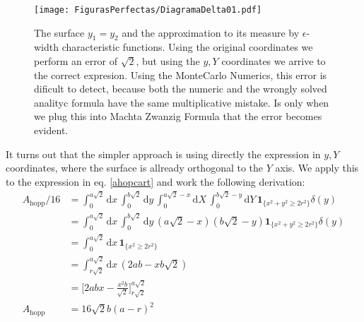 \documentclass[superscriptaddress,pre,reprint,showpacs,onecolumn]{revtex4-1}
\newcommand{\rd}[1]{\mathrm{d}{#1} \,}
\newcommand{\indicator}[1]{\mathbf{1}_{ \{   #1 \} } }
\begin{document}
\begin{figure}
\texttt{[image: FigurasPerfectas/DiagramaDelta01.pdf]}
\caption{The surface $y_1=y_2$ and the approximation to its measure by
  $\epsilon$-width characteristic functions. Using the original coordinates
  we perform an error of $\sqrt{2}$, but using the $y,Y$ coordinates
  we arrive to the correct expresion. Using the MonteCarlo Numerics, this
  error is dificult to detect, because both the numeric and the wrongly solved
  analityc formula have the same multiplicative mistake. Is only when we plug this into
Machta Zwanzig Formula that the error becomes evident. }\label{DiagramaDelta01}
\end{figure}

It turns out that the simpler approach is using directly the expression in $y,Y$
coordinates, where the surface is allready orthogonal to the $Y$ axis. 
We apply this to the expression in eq. \ref{ahopcart} and work the following
  derivation:
  \begin{align}
    A_\text{hopp}/16 & = \int_0^{a\sqrt{2}} \rd x  \int_0^{b \sqrt{2}} \rd y
    \int_0^{a\sqrt{2}-x} \rd X  \int_0^{b \sqrt{2}-y} \rd Y
    \indicator{x^2+y^2 \geq 2 r^2} \delta (y)\\
    &=  \int_0^{a\sqrt{2}} \rd x  \int_0^{b \sqrt{2}} \rd y
    (a\sqrt{2}-x)(b\sqrt{2}-y)
    \indicator{x^2+y^2 \geq 2 r^2} \delta (y)\\
    &= \int_0^{a\sqrt{2}} \rd x
    \indicator{x^2\geq 2 r^2} \\
    &= \int_{r\sqrt{2}}^{a\sqrt{2}} \rd x
    (2ab-xb\sqrt{2})\\
    &=\biggl[2abx-\frac{x^2b}{\sqrt{2}} \biggr]_{r\sqrt{2}}^{a\sqrt{2}}\\
      A_\text{hopp}&=16\sqrt{2}b(a-r)^2
  \end{align}
\end{document}
